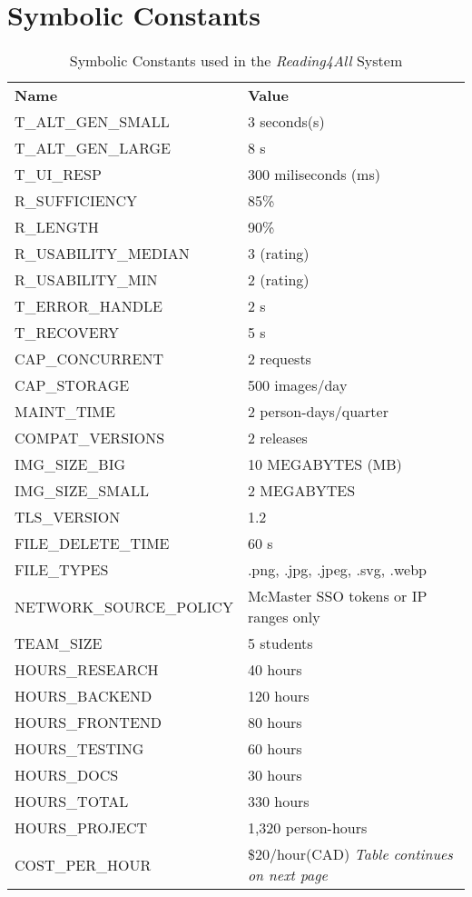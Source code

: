 \documentclass[12pt, titlepage]{article}
\begin{document}
\section*{Symbolic Constants}
\begin{longtable}{|p{8.0cm}|p{8.0cm}|}
  \captionsetup{justification=raggedright,singlelinecheck=false}
  \caption{Symbolic Constants used in the \textit{Reading4All} System}
  \label{tab:symbolic-constants} \\
  \toprule
  {\textbf{Name}} & {\textbf{Value}}\\
  \midrule
  T\_ALT\_GEN\_SMALL & 3 seconds(s) \\
  T\_ALT\_GEN\_LARGE & 8 s \\
  T\_UI\_RESP & 300 miliseconds (ms) \\
  R\_SUFFICIENCY & 85\% \\
  R\_LENGTH & 90\% \\
  R\_USABILITY\_MEDIAN & 3 (rating) \\
  R\_USABILITY\_MIN & 2 (rating) \\
  T\_ERROR\_HANDLE & 2 s \\
  T\_RECOVERY & 5 s \\
  CAP\_CONCURRENT & 2 requests \\
  CAP\_STORAGE & 500 images/day \\
  MAINT\_TIME & 2 person-days/quarter \\
  COMPAT\_VERSIONS & 2 releases \\
  IMG\_SIZE\_BIG & 10 MEGABYTES (MB) \\
  IMG\_SIZE\_SMALL & 2 MEGABYTES \\
  TLS\_VERSION & 1.2 \\
  FILE\_DELETE\_TIME & 60 s \\
  FILE\_TYPES & .png, .jpg, .jpeg, .svg, .webp \\
  NETWORK\_SOURCE\_POLICY & McMaster SSO tokens or IP ranges only\\
  TEAM\_SIZE & 5 students \\
  HOURS\_RESEARCH & 40 hours \\
  HOURS\_BACKEND & 120 hours \\
  HOURS\_FRONTEND & 80 hours \\
  HOURS\_TESTING & 60 hours \\
  HOURS\_DOCS & 30 hours \\
  HOURS\_TOTAL & 330 hours \\
  HOURS\_PROJECT & 1,320 person-hours \\
  COST\_PER\_HOUR & \$20/hour(CAD) \qquad\textit{Table continues on next page}\\

\end{longtable}
\end{document}
